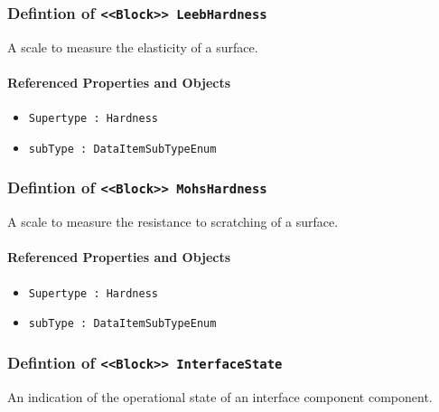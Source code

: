 \subsubsection{Defintion of \texttt{<<Block>> LeebHardness}}
  \label{type:LeebHardness}

\FloatBarrier

A scale to measure the elasticity of a surface.

\FloatBarrier
\paragraph{Referenced Properties and Objects}

\begin{itemize}
\item \texttt{Supertype : Hardness}

\item \texttt{subType : DataItemSubTypeEnum}

\end{itemize}
\FloatBarrier
\subsubsection{Defintion of \texttt{<<Block>> MohsHardness}}
  \label{type:MohsHardness}

\FloatBarrier

A scale to measure the resistance to scratching of a surface.

\FloatBarrier
\paragraph{Referenced Properties and Objects}

\begin{itemize}
\item \texttt{Supertype : Hardness}

\item \texttt{subType : DataItemSubTypeEnum}

\end{itemize}
\FloatBarrier
\subsubsection{Defintion of \texttt{<<Block>> InterfaceState}}
  \label{type:InterfaceState}

\FloatBarrier

An indication of the operational state of an interface component component.

